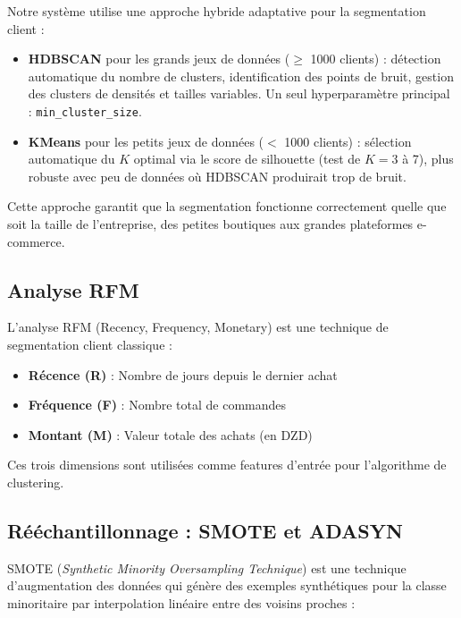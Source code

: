 \documentclass[12pt,a4paper]{report}
\begin{document}
Notre syst\`{e}me utilise une approche hybride adaptative pour la segmentation client :

\begin{itemize}
  \item \textbf{HDBSCAN} pour les grands jeux de donn\'{e}es ($\geq$ 1000 clients) : d\'{e}tection automatique du nombre de clusters, identification des points de bruit, gestion des clusters de densit\'{e}s et tailles variables. Un seul hyperparam\`{e}tre principal : \texttt{min\_cluster\_size}.
  \item \textbf{KMeans} pour les petits jeux de donn\'{e}es ($<$ 1000 clients) : s\'{e}lection automatique du $K$ optimal via le score de silhouette (test de $K=3$ \`{a} 7), plus robuste avec peu de donn\'{e}es o\`{u} HDBSCAN produirait trop de bruit.
\end{itemize}

Cette approche garantit que la segmentation fonctionne correctement quelle que soit la taille de l'entreprise, des petites boutiques aux grandes plateformes e-commerce.

\subsection{Analyse RFM}

L'analyse RFM (Recency, Frequency, Monetary) est une technique de segmentation client classique :

\begin{itemize}
  \item \textbf{R\'{e}cence (R)} : Nombre de jours depuis le dernier achat
  \item \textbf{Fr\'{e}quence (F)} : Nombre total de commandes
  \item \textbf{Montant (M)} : Valeur totale des achats (en DZD)
\end{itemize}

Ces trois dimensions sont utilis\'{e}es comme features d'entr\'{e}e pour l'algorithme de clustering.

\subsection{R\'{e}\'{e}chantillonnage : SMOTE et ADASYN}

SMOTE (\textit{Synthetic Minority Oversampling Technique}) \cite{chawla2002smote} est une technique d'augmentation des donn\'{e}es qui g\'{e}n\`{e}re des exemples synth\'{e}tiques pour la classe minoritaire par interpolation lin\'{e}aire entre des voisins proches :
\end{document}
